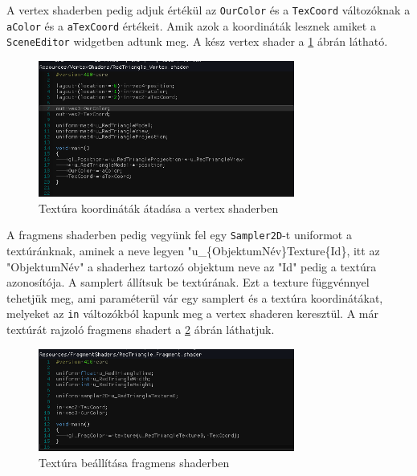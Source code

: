 \newpage

A vertex shaderben pedig adjuk értékül az \verb|OurColor| és a \verb|TexCoord| változóknak a \verb|aColor| és a \verb|aTexCoord| értékeit. Amik azok a koordináták lesznek amiket a \verb|SceneEditor| widgetben adtunk meg. A kész vertex shader a \ref{fig:vertexmodified} ábrán látható.

\begin{figure}[hbt!]
    \centering
    \includegraphics[width=0.75\textwidth,height=\textheight/2,keepaspectratio]
    {resources/Showcase/slimshady_VertexTextureModification.png}
    \caption{Textúra koordináták átadása a vertex shaderben}
    \label{fig:vertexmodified}
\end{figure}

A fragmens shaderben pedig vegyünk fel egy \verb|Sampler2D|-t uniformot a textúránknak, aminek a neve legyen "u\_\{ObjektumNév\}Texture\{Id\}, itt az "ObjektumNév" a shaderhez tartozó objektum neve az "Id" pedig a textúra azonosítója. A samplert állítsuk be textúrának. Ezt a texture függvénnyel tehetjük meg, ami paraméterül vár egy samplert és a textúra koordinátákat, melyeket az \verb|in| változókból kapunk meg a vertex shaderen keresztül. A már textúrát rajzoló fragmens shadert a \ref{fig:settexture} ábrán láthatjuk.

\begin{figure}[hbt!]
    \centering
    \includegraphics[width=0.75\textwidth,height=\textheight/2,keepaspectratio]
    {resources/Showcase/slimshady_fragmentTexture.png}
    \caption{Textúra beállítása fragmens shaderben}
    \label{fig:settexture}
\end{figure}

